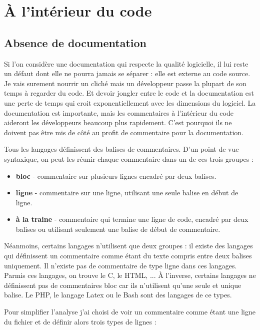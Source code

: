 \documentclass[10pt,a4paper,twoside, openany]{report}
\begin{document}
\chapter{\`A l'int\'erieur du code}

\section{Absence de documentation}

Si l'on consid\`ere une documentation qui respecte la qualit\'e logicielle, il lui reste un d\'efaut dont elle ne pourra jamais se s\'eparer : elle est externe au code source. Je vais surement nourrir un clich\'e mais un d\'eveloppeur passe la plupart de son temps \`a regarder du code. Et devoir jongler entre le code et la documentation est une perte de temps qui croit exponentiellement avec les dimensions du logiciel. La documentation est importante, mais les commentaires \`a l'int\'erieur du code aideront les d\'eveloppeurs beaucoup plus rapidement. C'est pourquoi ils ne doivent pas \^etre mis de c\^ot\'e au profit de commentaire pour la documentation.\newline

Tous les langages d\'efinissent des balises de commentaires. D'un point de vue syntaxique, on peut les r\'eunir chaque commentaire dans un de ces trois groupes :

\begin{itemize}
\item{\textbf{bloc} - commentaire sur plusieurs lignes encadr\'e par deux balises.}
\item{\textbf{ligne} - commentaire sur une ligne, utilisant une seule balise en d\'ebut de ligne.}
\item{\textbf{\`a la traine} - commentaire qui termine une ligne de code, encadr\'e par deux balises ou utilisant seulement une balise de d\'ebut de commentaire.}
\end{itemize}

N\'eanmoins, certains langages n'utilisent que deux groupes : il existe des langages qui d\'efinissent un commentaire comme \'etant du texte compris entre deux balises uniquement. Il n'existe pas de commentaire de type ligne dans ces langages. Parmis ces langages, on trouve le C, le HTML, ... \`A l'inverse, certains langages ne d\'efinissent pas de commentaires bloc car ils n'utilisent qu'une seule et unique balise. Le PHP, le langage Latex ou le Bash sont des langages de ce types.

Pour simplifier l'analyse j'ai choisi de voir un commentaire comme \'etant une ligne du fichier et de d\'efinir alors trois types de lignes :
\end{document}
